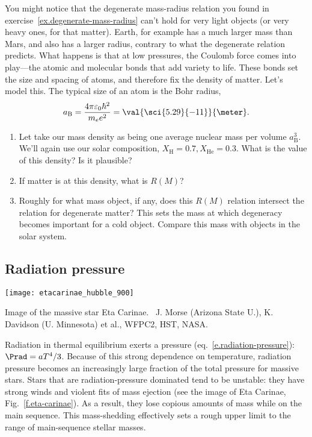 \begin{exercisebox}
\label{ex.planetary-M-and-R}
You might notice that the degenerate mass-radius relation you found in exercise~\ref{ex.degenerate-mass-radius} can't hold for very light objects (or very heavy ones, for that matter). Earth, for example has a much larger mass than Mars, and also has a larger radius, contrary to what the degenerate relation predicts. What happens is that at low pressures, the Coulomb force comes into play---the atomic and molecular bonds that add variety to life. These bonds set the size and spacing of atoms, and therefore fix the density of matter. Let's model this. The typical size of an atom is the Bohr radius,
\[
	a_{\mathrm{B}} = \frac{4\pi\varepsilon_{0}\hbar^{2}}{m_{e}e^{2}} = \val{\sci{5.29}{-11}}{\meter}.
\]
	\begin{enumerate}
	\item Let take our mass density as being one average nuclear mass per volume $a_{\mathrm{B}}^{3}$.  We'll again use our solar composition, $X_{\mathrm{H}}=0.7, X_{\mathrm{He}}=0.3$.
What is the value of this density? Is it plausible?
	\item If matter is at this density, what is $R(M)$?
	\item Roughly for what mass object, if any, does this $R(M)$ relation intersect the relation for degenerate matter? This sets the mass at which degeneracy becomes important for a cold object. Compare this mass with objects in the solar system.
	\end{enumerate}
\end{exercisebox}

\subsection{Radiation pressure}
\label{s.radiation-pressure}

\begin{marginfigure}
\texttt{[image: etacarinae\_hubble\_900]}
\caption[Image of the massive star Eta Carinae]{\label{f.eta-carinae} Image of the massive star Eta Carinae. \imgcred\ J. Morse (Arizona State U.), K. Davidson (U. Minnesota) et al., WFPC2, HST, NASA.}
\end{marginfigure}
Radiation in thermal equilibrium exerts a pressure (eq.~\ref{e.radiation-pressure}): $\Prad = aT^{4}/3$. Because of this strong dependence on temperature, radiation pressure becomes an increasingly large fraction of the total pressure for massive stars. Stars that are radiation-pressure dominated tend to be unstable: they have strong winds and violent fits of mass ejection (see the image of Eta Carinae, Fig.~\ref{f.eta-carinae}). As a result, they lose copious amounts of mass while on the main sequence. This mass-shedding effectively sets a rough upper limit to the range of main-sequence stellar masses.

